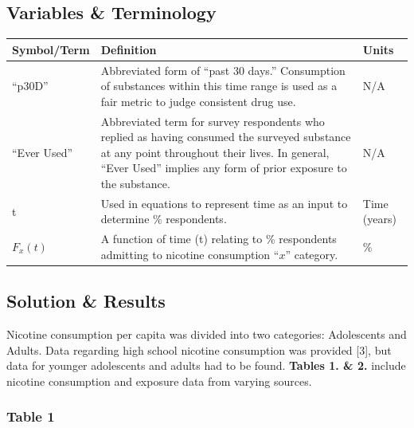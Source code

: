 \subsection{Variables \& Terminology}

\begin{center}
    \begin{tabular}{p{1.2in} p{4in} p{.5in}}
        \toprule
        \textbf{Symbol/Term} & \textbf{Definition} & \textbf{Units} \\
        \midrule
        “p30D” & Abbreviated form of “past 30 days.” Consumption of substances within this time range is used as a fair metric to judge consistent drug use. & N/A \\
        \midrule
        “Ever Used” & Abbreviated term for survey respondents who replied as having consumed the surveyed substance at any point throughout their lives. In general, “Ever Used” implies any form of prior exposure to the substance. & N/A \\
        \midrule
        t & Used in equations to represent time as an input to determine \% respondents. & Time (years) \\
        \midrule
        \(F_x(t)\) & A function of time (t) relating to \% respondents admitting to nicotine consumption ``\(x\)'' category. & \% \\
        \bottomrule
    \end{tabular}
\end{center}

\subsection{Solution \& Results}

Nicotine consumption per capita was divided into two categories: Adolescents and Adults. Data regarding high school nicotine consumption was provided [3], but data for younger adolescents and adults had to be found. \textbf{Tables 1. \& 2.} include nicotine consumption and exposure data from varying sources.

\subsubsection*{Table 1}

